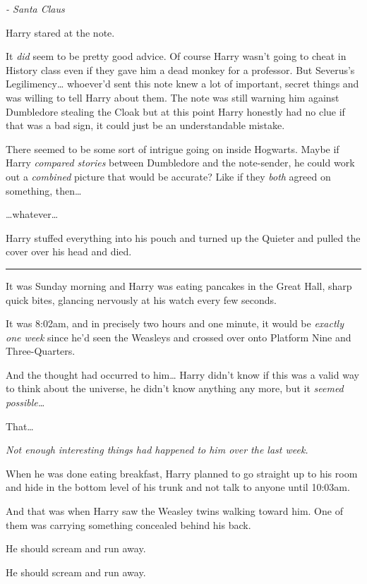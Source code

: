 \emph{- Santa Claus}

Harry stared at the note.

It \emph{did} seem to be pretty good advice. Of course Harry wasn't
going to cheat in History class even if they gave him a dead monkey for
a professor. But Severus's Legilimency\ldots{} whoever'd sent this note
knew a lot of important, secret things and was willing to tell Harry
about them. The note was still warning him against Dumbledore stealing
the Cloak but at this point Harry honestly had no clue if that was a bad
sign, it could just be an understandable mistake.

There seemed to be some sort of intrigue going on inside Hogwarts. Maybe
if Harry \emph{compared stories} between Dumbledore and the note-sender,
he could work out a \emph{combined} picture that would be accurate? Like
if they \emph{both} agreed on something, then\ldots{}

\ldots{}whatever\ldots{}

Harry stuffed everything into his pouch and turned up the Quieter and
pulled the cover over his head and died.

\begin{center}\rule{3in}{0.4pt}\end{center}

It was Sunday morning and Harry was eating pancakes in the Great Hall,
sharp quick bites, glancing nervously at his watch every few seconds.

It was 8:02am, and in precisely two hours and one minute, it would be
\emph{exactly one week} since he'd seen the Weasleys and crossed over
onto Platform Nine and Three-Quarters.

And the thought had occurred to him\ldots{} Harry didn't know if this
was a valid way to think about the universe, he didn't know anything any
more, but it \emph{seemed possible\ldots{}}

That\ldots{}

\emph{Not enough interesting things had happened to him over the last
week.}

When he was done eating breakfast, Harry planned to go straight up to
his room and hide in the bottom level of his trunk and not talk to
anyone until 10:03am.

And that was when Harry saw the Weasley twins walking toward him. One of
them was carrying something concealed behind his back.

He should scream and run away.

He should scream and run away.

